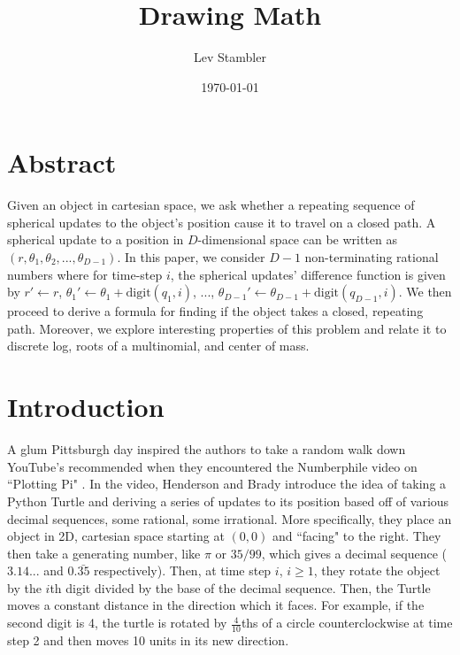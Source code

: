 \documentclass[11pt,titlepage]{article}
\newcommand{\myname}{Lev Stambler}
\begin{document}
\title{Drawing Math}

\author{\myname}

\date{\today}

\maketitle

\pagebreak
\section*{Abstract}
Given an object in cartesian space, we ask whether a repeating sequence 
of spherical updates to the object's position cause it to travel on a closed path.
A spherical update to a position in $D$-dimensional space can be written as
$\left(r, \theta_1, \theta_2, ..., \theta_{D-1}\right)$.
In this paper, we consider $D-1$ non-terminating
rational numbers where for time-step $i$, the spherical updates' difference function
is given by $r' \leftarrow r$, 
$\theta_1' \leftarrow \theta_1 + \mathrm{digit}(q_1, i)$, ..., 
$\theta_{D-1}' \leftarrow \theta_{D-1} + \mathrm{digit}(q_{D-1}, i)$.
We then proceed to derive a formula for finding if the object takes a closed, repeating path.
Moreover, we explore interesting properties of this problem and
relate it to discrete log, roots of a multinomial, and center of mass.



\section{Introduction}
A glum Pittsburgh day inspired the authors to take a random walk down YouTube's recommended
when they encountered the Numberphile video on ``Plotting Pi" \cite{NumberphileVid}.
In the video, Henderson and Brady introduce the idea of taking a Python Turtle and
deriving a series of updates to its position based off of various decimal sequences, 
some rational, some irrational. More specifically, they place an object in 2D, cartesian
space starting at $(0, 0)$ and ``facing" to the right. They then take a generating number, like $\pi$ or $35/99$, 
which gives a decimal sequence ($3.14...$ and $0.\bar{35}$ respectively). 
Then, at time step $i$, $i \geq 1$, they rotate the object by the $i$th digit divided by the base of
the decimal sequence. Then, the Turtle moves a constant distance in the direction which it faces.
For example, if the second digit is 4, the turtle is rotated by $\frac{4}{10}$ths of a circle
counterclockwise at time step 2 and then moves 10 units in its new direction.
\end{document}
